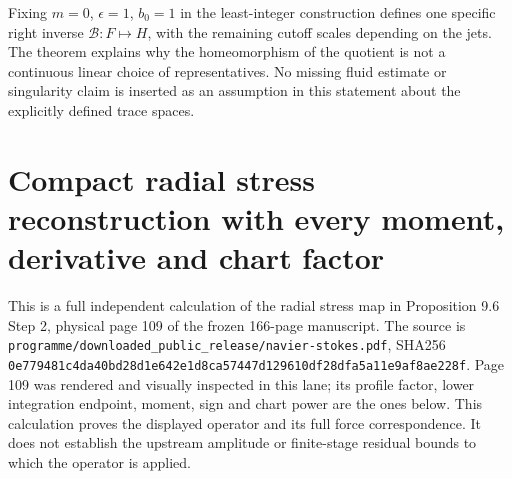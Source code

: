 \documentclass[10pt,a4paper]{article}
\begin{document}
Fixing $m=0$, $\epsilon=1$, $b_0=1$ in the least-integer construction
defines one specific right inverse $\mathcal B:F\mapsto H$, with the
remaining cutoff scales depending on the jets. The theorem explains why the
homeomorphism of the quotient is not a continuous linear choice of
representatives. No missing fluid estimate or singularity claim is inserted
as an assumption in this statement about the explicitly defined trace spaces.


\section{Compact radial stress reconstruction with every moment, derivative and chart factor}\label{nsupstream:radial_stress_reconstruction_audit:compact-radial-stress-reconstruction-with-every-moment-derivative-and-chart-factor}

This is a full independent calculation of the radial stress map in Proposition 9.6 Step 2, physical page 109 of the frozen 166-page manuscript. The source is \texttt{p\allowbreak{}r\allowbreak{}o\allowbreak{}g\allowbreak{}r\allowbreak{}a\allowbreak{}m\allowbreak{}m\allowbreak{}e\allowbreak{}/\allowbreak{}d\allowbreak{}o\allowbreak{}w\allowbreak{}n\allowbreak{}l\allowbreak{}o\allowbreak{}a\allowbreak{}d\allowbreak{}e\allowbreak{}d\allowbreak{}\_\allowbreak{}p\allowbreak{}u\allowbreak{}b\allowbreak{}l\allowbreak{}i\allowbreak{}c\allowbreak{}\_\allowbreak{}r\allowbreak{}e\allowbreak{}l\allowbreak{}e\allowbreak{}a\allowbreak{}s\allowbreak{}e\allowbreak{}/\allowbreak{}n\allowbreak{}a\allowbreak{}v\allowbreak{}i\allowbreak{}e\allowbreak{}r\allowbreak{}-\allowbreak{}s\allowbreak{}t\allowbreak{}o\allowbreak{}k\allowbreak{}e\allowbreak{}s\allowbreak{}.\allowbreak{}p\allowbreak{}d\allowbreak{}f}, SHA256 \texttt{0\allowbreak{}e\allowbreak{}7\allowbreak{}7\allowbreak{}9\allowbreak{}4\allowbreak{}8\allowbreak{}1\allowbreak{}c\allowbreak{}4\allowbreak{}d\allowbreak{}a\allowbreak{}4\allowbreak{}0\allowbreak{}b\allowbreak{}d\allowbreak{}2\allowbreak{}8\allowbreak{}d\allowbreak{}1\allowbreak{}e\allowbreak{}6\allowbreak{}4\allowbreak{}2\allowbreak{}e\allowbreak{}1\allowbreak{}d\allowbreak{}8\allowbreak{}c\allowbreak{}a\allowbreak{}5\allowbreak{}7\allowbreak{}4\allowbreak{}4\allowbreak{}7\allowbreak{}d\allowbreak{}1\allowbreak{}2\allowbreak{}9\allowbreak{}6\allowbreak{}1\allowbreak{}0\allowbreak{}d\allowbreak{}f\allowbreak{}2\allowbreak{}8\allowbreak{}d\allowbreak{}f\allowbreak{}a\allowbreak{}5\allowbreak{}a\allowbreak{}1\allowbreak{}1\allowbreak{}e\allowbreak{}9\allowbreak{}a\allowbreak{}f\allowbreak{}8\allowbreak{}a\allowbreak{}e\allowbreak{}2\allowbreak{}2\allowbreak{}8\allowbreak{}f}. Page 109 was rendered and visually inspected in this lane; its profile factor, lower integration endpoint, moment, sign and chart power are the ones below. This calculation proves the displayed operator and its full force correspondence. It does not establish the upstream amplitude or finite-stage residual bounds to which the operator is applied.
\end{document}
